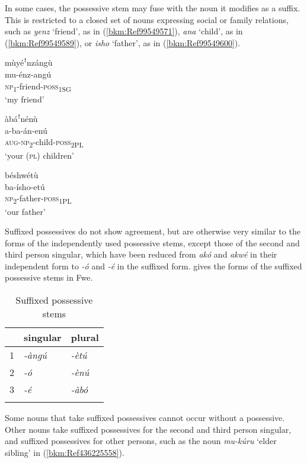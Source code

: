 In some cases, the possessive stem may fuse with the noun it modifies as a suffix. This is restricted to a closed set of nouns expressing social or family relations, such as \textit{yenz} ‘friend’, as in (\ref{bkm:Ref99549571}), \textit{ana} ‘child’, as in (\ref{bkm:Ref99549589}), or \textit{isho} ‘father’, as in (\ref{bkm:Ref99549600}).

\ea
\label{bkm:Ref99549571}
\glll mùyéꜝnzángù\\
mu-énz-angú\\
\textsc{np}\textsubscript{1}-friend-\textsc{poss}\textsubscript{1SG}\\
\glt ‘my friend’
\z

\ea
\label{bkm:Ref99549589}
\glll àbáꜝnénù\\
a-ba-án-enú\\
\textsc{aug}-\textsc{np}\textsubscript{2}-child-\textsc{poss}\textsubscript{2PL}\\
\glt ‘your (\textsc{pl}) children’
\z

\ea
\label{bkm:Ref99549600}
\glll béshwétù\\
ba-ísho-etú\\
\textsc{np}\textsubscript{2}-father-\textsc{poss}\textsubscript{1PL}\\
\glt ‘our father’
\z

Suffixed possessives do not show agreement, but are otherwise very similar to the forms of the independently used possessive stems, except those of the second and third person singular, which have been reduced from \textit{akó} and \textit{akwé} in their independent form to \textit{-ó} and \textit{-é} in the suffixed form.  gives the forms of the suffixed possessive stems in Fwe.

\begin{table}
\label{bkm:Ref98512548}\caption{\label{tab:4:22}Suffixed possessive stems}
\begin{tabular}{lll}
\lsptoprule
& singular & plural\\
\midrule
1 & \textit{-àngú} & {\itshape -ètú}\\
2 & \textit{-ó} & {\itshape -ènú}\\
3 & \textit{-é} & {\itshape -àbó}\\
\lspbottomrule
\end{tabular}
\end{table}

Some nouns that take suffixed possessives cannot occur without a possessive. Other nouns take suffixed possessives for the second and third person singular, and suffixed possessives for other persons, such as the noun \textit{mu-kúru} ‘elder sibling’ in (\ref{bkm:Ref436225558}).

